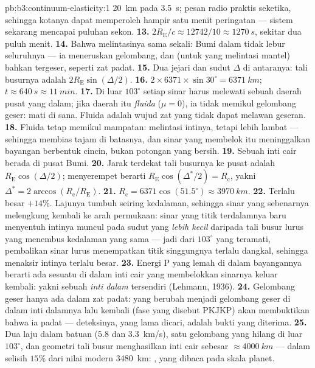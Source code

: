 \begin{solution}{pb:b3:continuum-elasticity:1}
\qty{20}{km} pada \qty{3.5}{s}; pesan radio praktis seketika, sehingga
kotanya dapat memperoleh hampir satu menit peringatan --- sistem
sekarang mencapai puluhan sekon.
\textbf{13.} $2R_{\text{E}}/c \approx 12742/10 \approx \qty{1270}{s}$,
sekitar dua puluh menit.
\textbf{14.} Bahwa  melintasinya sama sekali: Bumi
dalam tidak lebur seluruhnya --- ia meneruskan gelombang, dan (untuk
 yang melintasi mantel) bahkan tergeser, seperti zat padat.
\textbf{15.} Dua jejari dan sudut $\Delta$ di antaranya: tali busurnya
adalah $2R_{\text{E}}\sin(\Delta/2)$.
\textbf{16.} $2 \times 6371 \times \sin30^\circ = \qty{6371}{km}$;
$t \approx \qty{640}{s} \approx \qty{11}{min}$.
\textbf{17.} Di luar $103^\circ$ setiap sinar harus melewati sebuah
daerah pusat yang dalam; jika daerah itu \emph{fluida} ($\mu = 0$), ia
tidak memikul gelombang geser:  mati di sana. Fluida adalah
wujud zat yang tidak dapat melawan geseran.
\textbf{18.} Fluida tetap memikul mampatan:  melintasi
intinya, tetapi lebih lambat --- sehingga membias tajam di batasnya, dan
sinar yang membelok itu meninggalkan bayangan berbentuk cincin, bukan
potongan yang bersih.
\textbf{19.} Sebuah inti cair berada di pusat Bumi.
\textbf{20.} Jarak terdekat tali busurnya ke pusat adalah
$R_{\text{E}}\cos(\Delta/2)$; menyerempet berarti
$R_{\text{E}}\cos(\Delta^*/2) = R_{\text{c}}$, yakni $\Delta^* =
2\arccos(R_{\text{c}}/R_{\text{E}})$.
\textbf{21.} $R_{\text{c}} = 6371\cos(51.5^\circ) \approx
\qty{3970}{km}$.
\textbf{22.} Terlalu besar $+14\%$. Lajunya tumbuh seiring kedalaman,
sehingga sinar yang sebenarnya melengkung kembali ke arah permukaan:
sinar yang titik terdalamnya baru menyentuh intinya muncul pada sudut
yang \emph{lebih kecil} daripada tali busur lurus yang menembus
kedalaman yang sama --- jadi dari $103^\circ$ yang teramati, pembalikan
sinar lurus menempatkan titik singgungnya terlalu dangkal, sehingga
menaksir intinya terlalu besar.
\textbf{23.} Energi P yang lemah di dalam bayangannya berarti ada
sesuatu di dalam inti cair yang membelokkan sinarnya keluar kembali:
yakni sebuah \emph{inti dalam} tersendiri
(Lehmann, 1936).
\textbf{24.} Gelombang geser hanya ada dalam zat padat: 
yang berubah menjadi gelombang geser di dalam inti dalamnya lalu
kembali (fase yang disebut PKJKP) akan membuktikan bahwa ia padat ---
deteksinya, yang lama dicari, adalah bukti yang diterima.
\textbf{25.} Dua laju dalam batuan ($5.8$ dan \qty{3.3}{km/s}), satu
gelombang yang hilang di luar $103^\circ$, dan geometri tali busur
menghasilkan inti cair sebesar $\approx\qty{4000}{km}$ --- dalam
selisih $15\%$ dari nilai modern
\qty{3480}{km}: , yang dibaca pada skala planet.
\end{solution}
